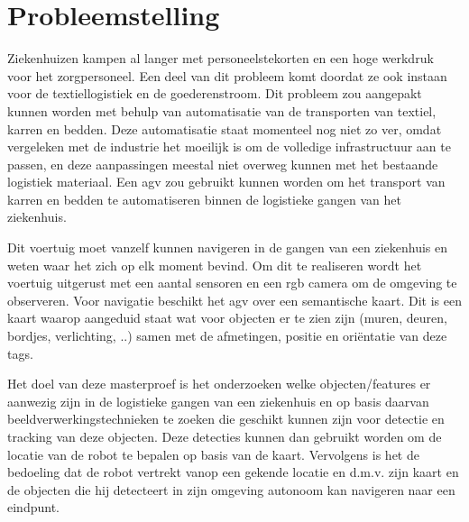 
\chapter{Probleemstelling}

Ziekenhuizen kampen al langer met personeelstekorten en een hoge werkdruk voor het zorgpersoneel. Een deel van dit probleem komt doordat ze ook instaan voor de textiellogistiek en de goederenstroom.
Dit probleem zou aangepakt kunnen worden met behulp van automatisatie van de transporten van textiel, karren en bedden. Deze automatisatie staat momenteel nog niet zo ver, omdat vergeleken met de industrie het moeilijk is om de volledige
infrastructuur aan te passen, en deze aanpassingen meestal niet overweg kunnen met het bestaande logistiek materiaal. Een \gls{agv} zou gebruikt kunnen worden om het transport van karren en bedden te automatiseren binnen de logistieke gangen van het ziekenhuis.

Dit voertuig moet vanzelf kunnen navigeren in de gangen van een ziekenhuis en weten waar het zich op elk moment bevind. Om dit te realiseren 
wordt het voertuig uitgerust met een aantal sensoren en een \gls{rgb} camera om de omgeving te observeren. Voor navigatie beschikt het \gls{agv}
over een semantische kaart. Dit is een kaart waarop aangeduid staat wat voor objecten er te zien zijn (muren, deuren, bordjes, verlichting, ..) samen met de afmetingen, positie en ori\"{e}ntatie van deze tags.


Het doel van deze masterproef is het onderzoeken welke objecten/features er aanwezig zijn in de logistieke gangen van een ziekenhuis en op basis daarvan
beeldverwerkingstechnieken te zoeken die geschikt kunnen zijn voor detectie en tracking van deze objecten. Deze detecties kunnen dan gebruikt worden om de locatie van de robot te bepalen op basis van de kaart.
Vervolgens is het de bedoeling dat de robot vertrekt vanop een gekende locatie en d.m.v. zijn kaart en de objecten die hij detecteert in zijn omgeving autonoom kan navigeren naar een eindpunt.